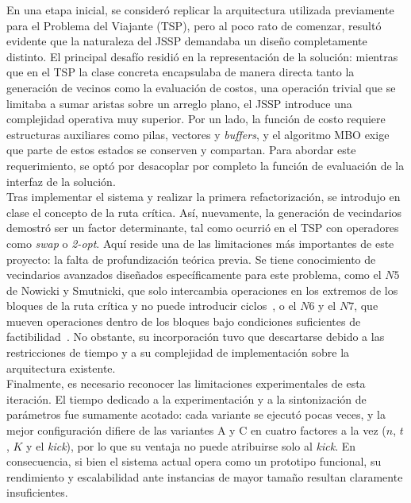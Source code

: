 \documentclass[9pt,a4paper,twocolumn,twoside]{rho-class/rho}
\begin{document}
En una etapa inicial, se consideró replicar la arquitectura utilizada previamente para el Problema del Viajante (TSP), pero al poco rato de comenzar, resultó evidente que
la naturaleza del JSSP demandaba un diseño completamente distinto. El principal desafío residió en la representación de la solución: mientras que en el TSP la
clase concreta encapsulaba de manera directa tanto la generación de vecinos como la evaluación de costos, una operación trivial que se limitaba a sumar aristas
sobre un arreglo plano, el JSSP introduce una complejidad operativa muy superior. Por un lado, la función de costo requiere estructuras auxiliares como pilas,
vectores y \textit{buffers}, y el algoritmo MBO exige que parte de estos estados se conserven y compartan. Para abordar este requerimiento, se optó por desacoplar por
completo la función de evaluación de la interfaz de la solución.\\

Tras implementar el sistema y realizar la primera refactorización, se introdujo en clase el concepto de la ruta crítica. Así, nuevamente, la generación de
vecindarios demostró ser un factor determinante, tal como ocurrió en el TSP con operadores como \textit{swap} o \textit{2-opt}. Aquí reside una de las limitaciones más
importantes de este proyecto: la falta de profundización teórica previa. Se tiene conocimiento de vecindarios avanzados diseñados específicamente para este problema,
como el $N5$ de Nowicki y Smutnicki, que solo intercambia operaciones en los extremos de los bloques de la ruta crítica y no puede introducir ciclos~\cite{nowicki1996}, o
el $N6$ y el $N7$, que mueven operaciones dentro de los bloques bajo condiciones suficientes de factibilidad~\cite{balas1998,zhang2007}. No obstante, su
incorporación tuvo que descartarse debido a las restricciones de tiempo y a su complejidad de implementación sobre la arquitectura existente.\\

Finalmente, es necesario reconocer las limitaciones experimentales de esta iteración. El tiempo dedicado a la experimentación y a la sintonización de parámetros
fue sumamente acotado: cada variante se ejecutó pocas veces, y la mejor configuración difiere de las variantes A y C en cuatro factores a la vez ($n$, $t$, $K$ y
el \textit{kick}), por lo que su ventaja no puede atribuirse solo al \textit{kick}. En consecuencia, si bien el
sistema actual opera como un prototipo funcional, su rendimiento y escalabilidad ante instancias de mayor tamaño resultan claramente insuficientes.\\
\end{document}
